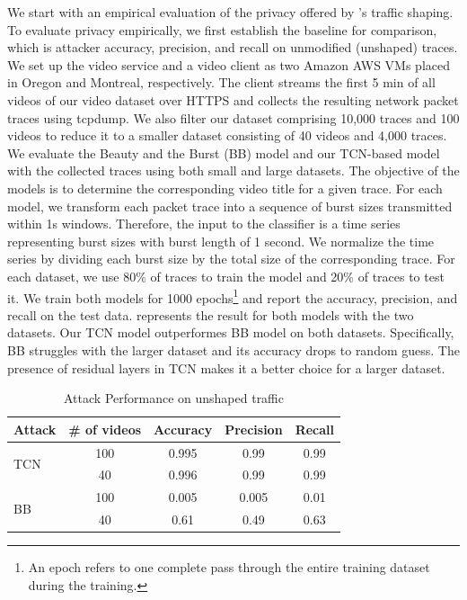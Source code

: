 We start with an empirical evaluation of the privacy offered by {\sys}'s traffic
shaping.
To evaluate privacy empirically, we first establish the baseline for comparison, which is attacker accuracy, precision, and recall on unmodified (\ie unshaped) traces.
We set up the video service and a video client as two Amazon AWS VMs placed in Oregon and Montreal, respectively.
The client streams the first 5 min of all videos of our video dataset over HTTPS and collects the resulting network packet traces using tcpdump.
We also filter our dataset comprising 10,000 traces and 100 videos to reduce it to a smaller dataset consisting of 40 videos and 4,000 traces.
We evaluate the Beauty and the Burst (BB) model and our TCN-based model with the collected traces using both small and large datasets.
The objective of the models is to determine the corresponding video title for a given trace. 
For each model, we transform each packet trace into a sequence of burst sizes
transmitted within 1s windows.
Therefore, the input to the classifier is a time series representing burst sizes with burst length of 1 second.
We normalize the time series by dividing each burst size by the total size of the corresponding trace.
For each dataset, we use 80\% of traces to train the model and 20\% of traces to test it. 
We train both models for 1000 epochs\footnote{An epoch refers to one complete pass through the entire training dataset during the training.} and report the accuracy, precision, and recall on the test data.
 represents the result for both models with the two datasets.
Our TCN model outperformes BB model on both datasets. 
Specifically, BB struggles with the larger dataset and its accuracy drops to random guess. 
The presence of residual layers in TCN makes it a better choice for a larger dataset.
\begin{table}[h]
  \centering
  \caption{Attack Performance on unshaped traffic}
  \begin{tabular}{|l|c|c|c|c|}
    \hline
    \textbf{Attack} & \textbf{\# of videos} & \textbf{Accuracy} & \textbf{Precision} & \textbf{Recall} \\ 
    \hline
    \multirow{2}{*}{TCN} & 100 & 0.995 & 0.99 & 0.99 \\ 
                         & 40  & 0.996 & 0.99 & 0.99 \\ 
    \hline
    \multirow{2}{*}{BB}  & 100 & 0.005  & 0.005 & 0.01 \\ 
                         & 40  & 0.61  & 0.49 & 0.63 \\ 
    \hline
  \end{tabular}\label{tab:attack-performance}
\end{table}

